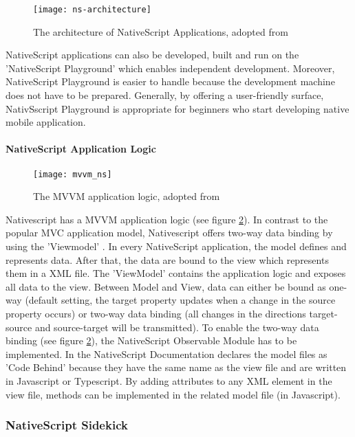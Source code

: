 \begin{figure}
\centering
\texttt{[image: ns-architecture]} 
\caption{\label{fig:nsarchitecture}The architecture of NativeScript Applications, adopted from \cite{nsarchitecture}} 
\end{figure}

NativeScript applications can also be developed, built and run on the 'NativeScript Playground' \cite{nsplayground} which enables independent development. Moreover, NativeScript Playground is easier to handle because the development machine does not have to be prepared. Generally, by offering a user-friendly surface, NativSscript Playground is appropriate for beginners who start developing native mobile application.

\paragraph{NativeScript Application Logic}

\begin{figure}
\centering
\texttt{[image: mvvm\_ns]} 
\caption{\label{fig:mvvm}The MVVM application logic, adopted from \cite{nativescript}} 
\end{figure}

Nativescript has a \ac{MVVM} application logic (see figure \ref{fig:mvvm}). In contrast to the popular \ac{MVC} application model, Nativescript offers two-way data binding by using the 'Viewmodel' \cite{nativescript}. In every NativeScript application, the model defines and represents data. After that, the data are bound to the view which represents them in a XML file. The 'ViewModel' contains the application logic and exposes all data to the view. Between Model and View, data can either be bound as one-way (default setting, the target property updates when a change in the source property occurs) or two-way data binding (all changes in the directions target-source and source-target will be transmitted). To enable the two-way data binding (see figure \ref{fig:mvvm}), the NativeScript Observable Module has to be implemented. 
In the NativeScript Documentation \cite{nativescript} declares the model files as 'Code Behind' because they have the same name as the view file and are written in Javascript or Typescript. By adding attributes to any XML element in the view file, methods can be implemented in the related model file (in Javascript). 

\subsubsection{NativeScript Sidekick} \label{Native}

